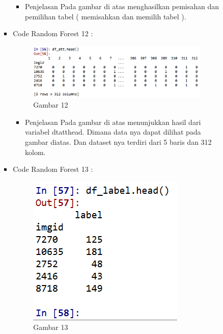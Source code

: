 \begin{enumerate}
\begin{itemize}
\begin{itemize}
\begin{itemize}
\begin{itemize}
\item Penjelasan Pada gambar di atas menghasilkan pemisahan dan pemilihan tabel ( memisahkan dan memilih tabel ). 
\par
\par
\end{itemize}
\item Code Random Forest 12 :
\par
\begin{figure}[ht]
\centering
\includegraphics[scale=0.7]{figures/andi/RF12.PNG}
\caption{Gambar 12}
\label{contoh}
\end{figure}
\par
\begin{itemize}
\item Penjelasan Pada gambar di atas menunjukkan hasil dari variabel dtatthead. Dimana data nya dapat dilihat pada gambar diatas. Dan dataset nya terdiri dari 5 baris dan 312 kolom.
\par
\par
\end{itemize}
\item Code Random Forest 13 :
\par
\begin{figure}[ht]
\centering
\includegraphics[scale=0.7]{figures/andi/RF13.PNG}
\caption{Gambar 13}
\label{contoh}
\end{figure}
\par

\end{itemize}
\end{itemize}
\end{itemize}
\end{enumerate}
